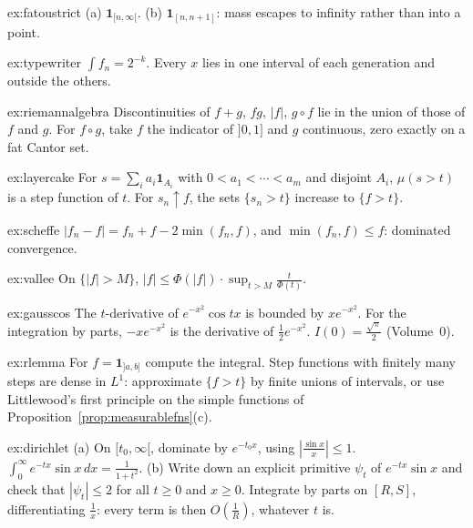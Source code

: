 \begin{hint}{ex:fatoustrict}
(a) $\mathbf 1_{[n,\infty[}$. (b) $\mathbf 1_{[n,n+1]}$: mass escapes to infinity rather than into a point.
\end{hint}
\begin{hint}{ex:typewriter}
$\int f_n=2^{-k}$. Every $x$ lies in one interval of each generation and outside the others.
\end{hint}
\begin{hint}{ex:riemannalgebra}
Discontinuities of $f+g$, $fg$, $|f|$, $g\circ f$ lie in the union of those of $f$ and $g$. For $f\circ g$, take $f$ the indicator of $]0,1]$ and $g$ continuous, zero exactly on a fat
Cantor set.
\end{hint}
\begin{hint}{ex:layercake}
For $s=\sum_ia_i\mathbf 1_{A_i}$ with $0<a_1<\cdots<a_m$ and disjoint $A_i$, $\mu(s>t)$ is a step function of $t$. For $s_n\uparrow f$, the sets $\{s_n>t\}$ increase to $\{f>t\}$.
\end{hint}
\begin{hint}{ex:scheffe}
$|f_n-f|=f_n+f-2\min(f_n,f)$, and $\min(f_n,f)\le f$: dominated convergence.
\end{hint}
\begin{hint}{ex:vallee}
On $\{|f|>M\}$, $|f|\le\Phi(|f|)\cdot\sup_{t>M}\frac t{\Phi(t)}$.
\end{hint}
\begin{hint}{ex:gausscos}
The $t$-derivative of $e^{-x^2}\cos tx$ is bounded by $xe^{-x^2}$. For the integration by parts, $-xe^{-x^2}$ is the derivative of $\frac12e^{-x^2}$. $I(0)=\frac{\sqrt\pi}2$ (Volume~0).
\end{hint}
\begin{hint}{ex:rlemma}
For $f=\mathbf 1_{]a,b]}$ compute the integral. Step functions with finitely many steps are dense in $L^1$: approximate $\{f>t\}$ by finite unions of intervals, or use Littlewood's first
principle on the simple functions of Proposition~\ref{prop:measurablefns}(c).
\end{hint}
\begin{hint}{ex:dirichlet}
(a) On $[t_0,\infty[$, dominate by $e^{-t_0x}$, using $|\frac{\sin x}x|\le1$. $\int_0^\infty e^{-tx}\sin x\,dx=\frac1{1+t^2}$. (b) Write down an explicit primitive $\psi_t$ of $e^{-tx}\sin x$ and check that $|\psi_t|\le2$ for all $t\ge0$ and $x\ge0$. Integrate by
parts on $[R,S]$, differentiating $\frac1x$: every term is then $O(\frac1R)$, whatever $t$ is.
\end{hint}

